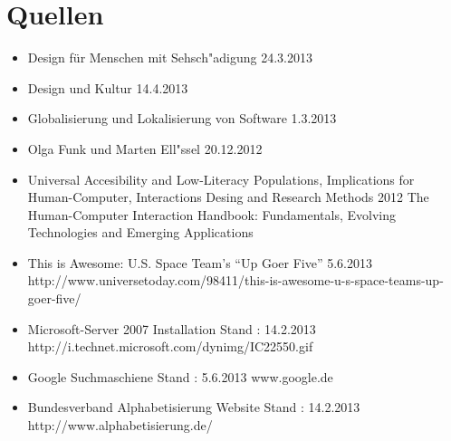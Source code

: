 \newpage 



\thispagestyle{empty}



 \section*{Quellen}




\begin{itemize}
\item {}
				{Design für Menschen mit Sehsch"adigung}
				{24.3.2013}
				{}

\item {}
				{Design und Kultur}
				{14.4.2013}
				{}

\item {}
				{Globalisierung und Lokalisierung von Software}
				{1.3.2013}
				{}

\item {}
				{Olga Funk und Marten Ell"ssel}
				{20.12.2012}
				{}


 	 \item {}
					{Universal Accesibility and Low-Literacy Populations, Implications for Human-Computer, Interactions Desing and Research Methods}
					{2012}
					{The Human-Computer Interaction Handbook: Fundamentals, Evolving Technologies and Emerging Applications}

	 \item {}
				{This is Awesome: U.S. Space Team’s “Up Goer Five”}
				{5.6.2013}
				{http://www.universetoday.com/98411/this-is-awesome-u-s-space-teams-up-goer-five/}


	 \item {}
						{Microsoft-Server 2007 Installation}
						{Stand : 14.2.2013}
						{http://i.technet.microsoft.com/dynimg/IC22550.gif} 

	 \item {}
						{Google Suchmaschiene}
						{Stand : 5.6.2013}
						{www.google.de}

	 \item {}
						{Bundesverband Alphabetisierung Website}
						{Stand : 14.2.2013}
						{http://www.alphabetisierung.de/}


\end{itemize}
